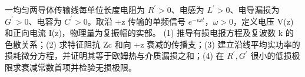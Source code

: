 一均匀两导体传输线每单位长度电阻为 \(R^{\prime}>0\)、电感为 \(L^{\prime}>0\)、电导漏损为 \(G^{\prime}>0\)、电容为 \(C^{\prime}>0\)。取沿 +z 传输的单频信号 \(e^{-i\omega t}\)，\(\omega >0\)，定义电压 V(z) 和正向电流 I(z)，物理量为复振幅的实部。
(1) 推导有损电报方程及复波数 k 的色散关系；(2) 求特征阻抗 Zc 和向 +z 衰减的传播支；(3) 建立沿线平均实功率的损耗微分方程，并证明其等于欧姆热与介质漏损之和；(4) 在 \(R^{\prime},G^{\prime}\) 很小的低损极限求衰减常数首项并检验无损极限。
